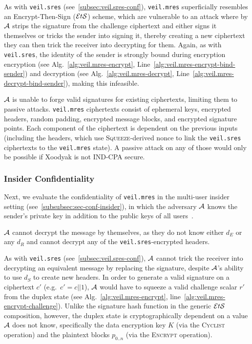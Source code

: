 As with \texttt{veil.sres} (see~\ref{subsec:veil.sres-conf}), \texttt{veil.mres} superficially resembles an
Encrypt-Then-Sign ($\mathcal{E}t\mathcal{S}$) scheme, which are vulnerable to an attack where by $\mathcal{A}$ strips the signature from the
challenge ciphertext and either signs it themselves or tricks the sender into signing it, thereby creating a new
ciphertext they can then trick the receiver into decrypting for them.
Again, as with \texttt{veil.sres}, the identity of the sender is strongly bound during encryption
encryption (see Alg.~\ref{alg:veil.mres-encrypt}, Line~\ref{alg:veil.mres-encrypt-bind-sender}) and decryption
(see Alg.~\ref{alg:veil.mres-decrypt}, Line~\ref{alg:veil.mres-decrypt-bind-sender}), making this infeasible.

$\mathcal{A}$ is unable to forge valid signatures for existing ciphertexts, limiting them to passive attacks.
\texttt{veil.mres} ciphertexts consist of ephemeral keys, encrypted headers, random padding, encrypted message blocks,
and encrypted signature points.
Each component of the ciphertext is dependent on the previous inputs (including the headers, which use
\textsc{Squeeze}-derived nonce to link the \texttt{veil.sres} ciphertexts to the \texttt{veil.mres} state).
A passive attack on any of those would only be possible if Xoodyak is not IND-CPA secure.

\subsubsection{Insider Confidentiality}

Next, we evaluate the confidentiality of \texttt{veil.mres} in the multi-user insider setting
(see~\ref{subsubsec:sec-conf-insider}), in which the adversary $\mathcal{A}$ knows the sender's private key in addition
to the public keys of all users~\cite[p. 45--46]{baek2010}.

$\mathcal{A}$ cannot decrypt the message by themselves, as they do not know either $d_E$ or any $d_R$ and cannot decrypt
any of the \texttt{veil.sres}-encrypted headers.

As with \texttt{veil.sres} (see~\ref{subsec:veil.sres-conf}),
$\mathcal{A}$ cannot trick the receiver into decrypting an equivalent message by replacing the signature, despite
$\mathcal{A}$'s ability to use $d_S$ to create new headers.
In order to generate a valid signature on a ciphertext $c'$ (e.g.\ $c'=c||1$), $\mathcal{A}$ would have to squeeze a
valid challenge scalar $r'$ from the duplex state (see Alg.~\ref{alg:veil.mres-encrypt},
line~\ref{alg:veil.mres-encrypt-challenge}).
Unlike the signature hash function in the generic $\mathcal{E}t\mathcal{S}$ composition, however, the duplex state is cryptographically
dependent on a value $\mathcal{A}$ does not know, specifically the data encryption key $K$ (via the \textsc{Cyclist}
operation) and the plaintext blocks $p_{0..n}$ (via the \textsc{Encrypt} operation).

